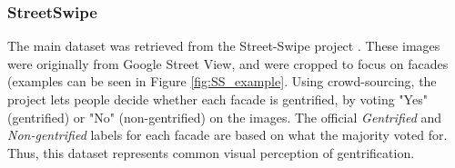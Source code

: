 \subsubsection{StreetSwipe}
The main dataset was retrieved from the Street-Swipe project \cite{streetswipe}. These images were originally from Google Street View, and were cropped to focus on facades (examples can be seen in Figure \ref{fig:SS_example}. Using crowd-sourcing, the project lets people decide whether each facade is gentrified, by voting "Yes" (gentrified) or "No" (non-gentrified) on the images. The official \textit{Gentrified} and \textit{Non-gentrified} labels for each facade are based on what the majority voted for. Thus, this dataset represents common visual perception of gentrification. 

